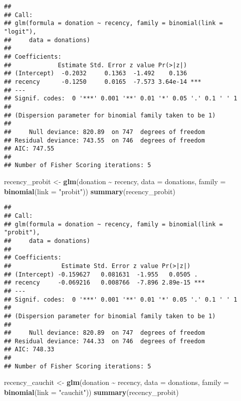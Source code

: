 \documentclass[
]{article}
\newenvironment{Shaded}{\begin{snugshade}}{\end{snugshade}}
\newcommand{\AttributeTok}[1]{\textcolor[rgb]{0.13,0.29,0.53}{#1}}
\newcommand{\FunctionTok}[1]{\textcolor[rgb]{0.13,0.29,0.53}{\textbf{#1}}}
\newcommand{\NormalTok}[1]{#1}
\newcommand{\OtherTok}[1]{\textcolor[rgb]{0.56,0.35,0.01}{#1}}
\newcommand{\SpecialCharTok}[1]{\textcolor[rgb]{0.81,0.36,0.00}{\textbf{#1}}}
\newcommand{\StringTok}[1]{\textcolor[rgb]{0.31,0.60,0.02}{#1}}
\begin{document}
\begin{verbatim}
## 
## Call:
## glm(formula = donation ~ recency, family = binomial(link = "logit"), 
##     data = donations)
## 
## Coefficients:
##             Estimate Std. Error z value Pr(>|z|)    
## (Intercept)  -0.2032     0.1363  -1.492    0.136    
## recency      -0.1250     0.0165  -7.573 3.64e-14 ***
## ---
## Signif. codes:  0 '***' 0.001 '**' 0.01 '*' 0.05 '.' 0.1 ' ' 1
## 
## (Dispersion parameter for binomial family taken to be 1)
## 
##     Null deviance: 820.89  on 747  degrees of freedom
## Residual deviance: 743.55  on 746  degrees of freedom
## AIC: 747.55
## 
## Number of Fisher Scoring iterations: 5
\end{verbatim}

\begin{Shaded}
\begin{Highlighting}[]
\NormalTok{recency\_probit }\OtherTok{\textless{}{-}} \FunctionTok{glm}\NormalTok{(donation }\SpecialCharTok{\textasciitilde{}}\NormalTok{ recency, }\AttributeTok{data =}\NormalTok{ donations, }\AttributeTok{family =} \FunctionTok{binomial}\NormalTok{(}\AttributeTok{link =} \StringTok{"probit"}\NormalTok{))}
\FunctionTok{summary}\NormalTok{(recency\_probit)}
\end{Highlighting}
\end{Shaded}

\begin{verbatim}
## 
## Call:
## glm(formula = donation ~ recency, family = binomial(link = "probit"), 
##     data = donations)
## 
## Coefficients:
##              Estimate Std. Error z value Pr(>|z|)    
## (Intercept) -0.159627   0.081631  -1.955   0.0505 .  
## recency     -0.069216   0.008766  -7.896 2.89e-15 ***
## ---
## Signif. codes:  0 '***' 0.001 '**' 0.01 '*' 0.05 '.' 0.1 ' ' 1
## 
## (Dispersion parameter for binomial family taken to be 1)
## 
##     Null deviance: 820.89  on 747  degrees of freedom
## Residual deviance: 744.33  on 746  degrees of freedom
## AIC: 748.33
## 
## Number of Fisher Scoring iterations: 5
\end{verbatim}

\begin{Shaded}
\begin{Highlighting}[]
\NormalTok{recency\_cauchit }\OtherTok{\textless{}{-}} \FunctionTok{glm}\NormalTok{(donation }\SpecialCharTok{\textasciitilde{}}\NormalTok{ recency, }\AttributeTok{data =}\NormalTok{ donations, }\AttributeTok{family =} \FunctionTok{binomial}\NormalTok{(}\AttributeTok{link =} \StringTok{"cauchit"}\NormalTok{))}
\FunctionTok{summary}\NormalTok{(recency\_probit)}
\end{Highlighting}
\end{Shaded}
\end{document}
